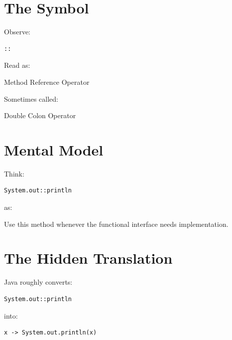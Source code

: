 \documentclass[11pt,a4paper]{book}
\begin{document}

\section{The Symbol}

Observe:

\begin{verbatim} 
::
\end{verbatim}


Read as:


Method Reference Operator


Sometimes called:


Double Colon Operator


\section{Mental Model}

Think:

\begin{verbatim} 
System.out::println
\end{verbatim}

as:


Use this method whenever
the functional interface
needs implementation.


\section{The Hidden Translation}

Java roughly converts:

\begin{verbatim} 
System.out::println
\end{verbatim}

into:

\begin{verbatim} 
x -> System.out.println(x)
\end{verbatim}
\end{document}
